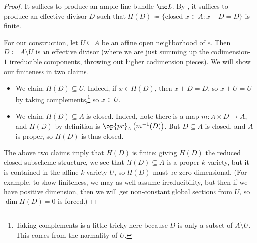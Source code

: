\documentclass[../notes.tex]{subfiles}
\begin{document}
\begin{proof}
	It suffices to produce an ample line bundle $\mc L$. By , it suffices to produce an effective divisor $D$ such that $H(D)\coloneqq\{\text{closed }x\in A:x+D=D\}$ is finite.
	
	For our construction, let $U\subseteq A$ be an affine open neighborhood of $e$. Then $D\coloneqq A\setminus U$ is an effective divisor (where we are just summing up the codimension-$1$ irreducible components, throwing out higher codimension pieces). We will show our finiteness in two claims.
	\begin{itemize}
		\item We claim $H(D)\subseteq U$. Indeed, if $x\in H(D)$, then $x+D=D$, so $x+U=U$ by taking complements,\footnote{Taking complements is a little tricky here because $D$ is only a subset of $A\setminus U$. This comes from the normality of $U$.} so $x\in U$.
		\item We claim $H(D)\subseteq A$ is closed. Indeed, note there is a map $m\colon A\times D\to A$, and $H(D)$ by definition is $\op{pr}_A\left(m^{-1}(D)\right)$. But $D\subseteq A$ is closed, and $A$ is proper, so $H(D)$ is thus closed.
	\end{itemize}
	The above two claims imply that $H(D)$ is finite: giving $H(D)$ the reduced closed subscheme structure, we see that $H(D)\subseteq A$ is a proper $k$-variety, but it is contained in the affine $k$-variety $U$, so $H(D)$ must be zero-dimensional. (For example, to show finiteness, we may as well assume irreducibility, but then if we have positive dimension, then we will get non-constant global sections from $U$, so $\dim H(D)=0$ is forced.)
\end{proof}
\end{document}
